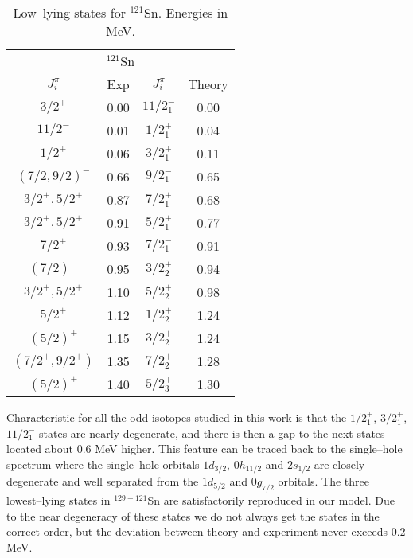\begin{table}[htbp]
\begin{center}
\begin{tabular}{cccc}
\hline 
\multicolumn{4}{c}{ $^{121}$Sn} \\ 
{$J^{\pi}_i$} &{Exp} &{$J^{\pi}_i$} &{Theory} \\
\hline 
$3/2^{+}$            & 0.00 & $11/2^{-}_{1}$ & 0.00 \\
$11/2^{-}$           & 0.01 & $1/2^{+}_{1}$  & 0.04 \\
$1/2^{+}$            & 0.06 & $3/2^{+}_{1}$  & 0.11 \\
$(7/2,9/2)^{-}$      & 0.66 & $9/2^{-}_{1}$  & 0.65 \\
$3/2^{+},5/2^{+}$    & 0.87 & $7/2^{+}_{1}$  & 0.68 \\
$3/2^{+},5/2^{+}$    & 0.91 & $5/2^{+}_{1}$  & 0.77 \\
$7/2^{+}$            & 0.93 & $7/2^{-}_{1}$  & 0.91 \\
$(7/2)^{-}$          & 0.95 & $3/2^{+}_{2}$  & 0.94 \\
$3/2^{+},5/2^{+}$    & 1.10 & $5/2^{+}_{2}$  & 0.98 \\
$5/2^{+}$            & 1.12 & $1/2^{+}_{2}$  & 1.24 \\
$(5/2)^{+}$          & 1.15 & $3/2^{+}_{2}$  & 1.24 \\
$(7/2^{+},9/2^{+})$  & 1.35 & $7/2^{+}_{2}$  & 1.28 \\
$(5/2)^{+}$          & 1.40 & $5/2^{+}_{3}$  & 1.30 \\
\hline 
\end{tabular}
\caption{Low--lying states for  $^{121}$Sn. Energies in MeV.}
\label{tab:121sn}
\end{center}
\end{table}
Characteristic for all the odd isotopes studied in this work is that the 
$1/2^{+}_{1}$, $3/2^{+}_{1}$, $11/2^{-}_{1}$ states are nearly degenerate,
and there is then a gap to the next states located about 0.6 MeV higher. This
feature can be traced back to the single--hole spectrum where the single--hole
orbitals $1d_{3/2}$, $0h_{11/2}$ and $2s_{1/2}$ are closely degenerate and
well separated from the $1d_{5/2}$ and $0g_{7/2}$ orbitals. The three 
lowest--lying states in $^{129-121}$Sn are satisfactorily reproduced in our 
model. 
Due to the near degeneracy of these states we do not always get the states in 
the correct order, but the deviation between theory and experiment never 
exceeds 0.2 MeV.

